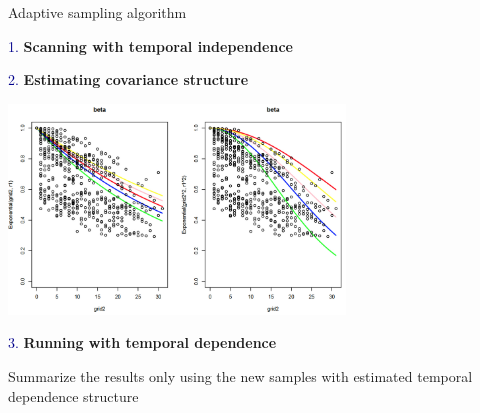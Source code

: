 \documentclass[serif,mathserif,final,table]{beamer}
\begin{document}
\begin{frame}{}
\begin{columns}[t]
    \begin{column}{0.235\linewidth}
    	
    	      \begin{block}{Adaptive sampling algorithm}
    	       		 \begin{algorithm}[H]
    	       		 	\SetAlgoLined
    	       		 	\caption{\textcolor{darkblue}{1. }\textbf{Scanning with temporal independence}}
    	       			\end{algorithm}
    	       		   	 \begin{algorithm}[H]
    	       		   	 	\caption{\textcolor{darkblue}{2. }\textbf{Estimating covariance structure}}
    	       		   	\end{algorithm}
    	       		   	 \centering
    	       		   	 \includegraphics[width=0.67\textwidth]{betacor.jpeg}
    	       		    \begin{algorithm}[H]
    	       		    	\caption{\textcolor{darkblue}{3. }\textbf{Running with temporal dependence}}
    	       		   	Summarize the results only using the new samples with estimated temporal dependence structure
    	       		   \end{algorithm}    	       		  
    	      \end{block}
    	      

\end{column}
\end{columns}
\end{frame}
\end{document}
